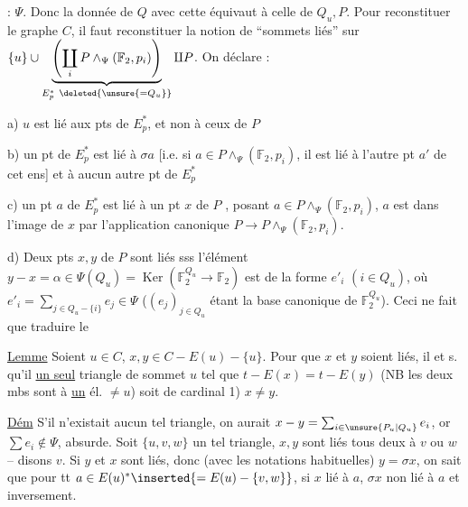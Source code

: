  : $\Psi$. Donc la donnée de  $Q$ avec cette  équivaut à celle de $Q_u,P$. Pour reconstituer le graphe $C$, il faut reconstituer la notion de ``sommets liés'' sur $\{u\}\cup\underbrace{\left(\coprod_i P\wedge_{\Psi}(\mathbb F_2,p_i)\right)}_{E_{p}^*\ \deleted{\unsure{=Q_u}}}\amalg P$. On déclare :

a) $u$ est lié aux pts de $E_p^*$, et non à ceux de $P$

b) un  pt  de $E_p^*$ est lié à $\sigma a$ [i.e. si $a\in P\wedge_{\Psi}(\mathbb F_2,p_i)$, il est lié à l'autre pt $a'$ de cet ens] et à aucun autre pt de $E_p^*$

c) un pt $a$ de $E_p^*$ est lié à un pt  $x$ de $P$ , posant $a\in P\wedge_{\Psi}(\mathbb F_2,p_i)$, $a$ est dans l'image de $x$ par l'application canonique $P\longrightarrow P\wedge_{\Psi}(\mathbb F_2,p_i)$.

d) Deux pts $x,y$ de $P$ sont liés sss l'élément $y-x=\alpha\in\Psi(Q_u)=\operatorname{Ker}(\mathbb F_{2}^{Q_u}\longrightarrow\mathbb F_2)$ est  de la forme  $e'_i$ $(i\in Q_u)$, où $e'_i=\sum_{j\in Q_u-\{i\}}e_j\in\Psi$ ($(e_j)_{j\in Q_u}$ étant la base canonique de $\mathbb F_2^{Q_u}$). Ceci ne fait que traduire le

\uline{Lemme} Soient $u\in C$, $x,y\in C-E(u)-\{u\}$. Pour que $x$ et $y$ soient liés, il  et s. qu'il       \uline{un seul} triangle de sommet $u$ tel que $t-E(x)=t-E(y)$ (NB les deux mbs sont   à \uline{un} él. $\ne u$) soit  de cardinal 1)  $x\ne y$.

\uline{Dém} S'il n'existait aucun tel triangle, on aurait $x-y=\sum_{i\in\unsure{P_u|Q_u}}e_i$, or $\sum e_i\notin\Psi$,  absurde. Soit $\{u,v,w\}$ un tel triangle,  $x,y$ sont liés tous deux à $v$ ou $w$ -- disons $v$. Si $y$ et $x$ sont liés, donc (avec les notations habituelles) $y=\sigma x$, on sait que pour tt $a\in E(u)^*\inserted{=E(u)-\{v,w\}}$, si $x$ lié à $a$, $\sigma x$ non lié à $a$ et inversement.
